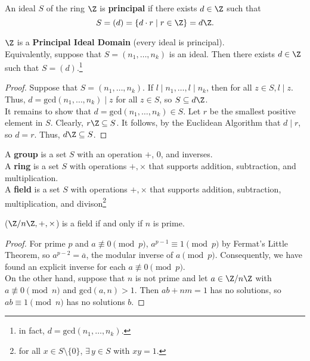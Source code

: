 \documentclass[11pt]{article}
\begin{document}
\begin{definition}
An ideal $S$ of the ring $\Z$ is \textbf{principal} if there exists $d \in \Z$ such that
\[ S = (d) = \{ d \cdot r \mid r \in \Z \} = d\Z. \]     
\end{definition}

\begin{theorem}
$\Z$ is a \textbf{Principal Ideal Domain} (every ideal is principal). \\

Equivalently, suppose that $S = (n_1, \dots, n_k)$ is an ideal. Then there exists $d \in \Z$ such that $S = (d)$.\footnote{in fact, $d = \mathrm{gcd}(n_1, \dots, n_k)$. }
\end{theorem}

\begin{proof}
Suppose that $S = (n_1, \dots, n_k).$ If $l \mid n_1, \dots, l \mid n_k$, then for all $z \in S, l \mid z$. 
Thus, $d = \mathrm{gcd}(n_1, \dots, n_k) \mid z$ for all $z \in S$, so $S \subseteq d\Z$. \\

It remains to show that $d = \mathrm{gcd}(n_1, \dots, n_k) \in S.$ Let $r$ be the smallest positive element in $S$. Clearly, $r\Z \subseteq S$. 
It follows, by the Euclidean Algorithm that $d \mid r$, so $d = r$. Thus, $d\Z \subseteq S$.
\end{proof}

\begin{definition}
A \textbf{group} is a set $S$ with an operation $+$, $0$, and inverses. \\

A \textbf{ring} is a set $S$ with operations $+, \times$ that supports addition, subtraction, and multiplication. \\

A \textbf{field} is a set $S$ with operations $+, \times$ that supports addition, subtraction, multiplication, and divison\footnote{for all $x \in S \setminus \{0\}$, $\exists \, y \in S$ with $xy = 1$.}
\end{definition}

\begin{theorem}
($\Z / n\Z, +, \times$) is a field if and only if $n$ is prime.
\end{theorem}

\begin{proof}
For prime $p$ and $a \not\equiv 0 \pmod p$, $a^{p-1} \equiv 1 \pmod p$ by Fermat's Little Theorem, so $a^{p-2} = \overline{a}$, the modular inverse of $a \pmod p.$ Consequently, we have
found an explicit inverse for each $a \not\equiv 0 \pmod p$. \\

On the other hand, suppose that $n$ is not prime and let $a \in \Z / n\Z$ with $a \not\equiv 0 \pmod n$ and $\mathrm{gcd}(a, n) > 1$. Then $ab + nm = 1$ has no solutions, so $ab \equiv 1 \pmod n$ has no solutions $b$.  
\end{proof}
\end{document}
